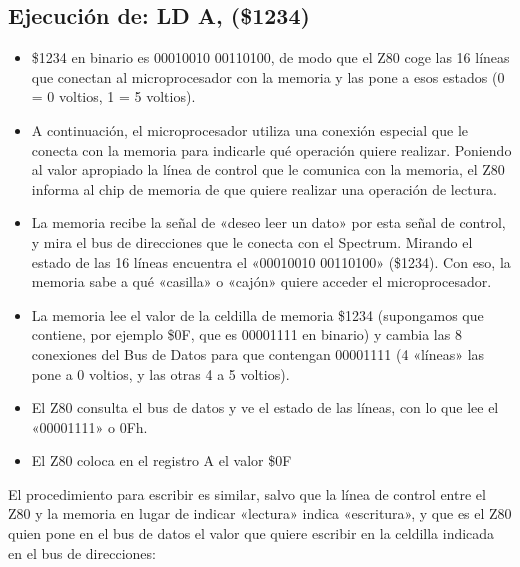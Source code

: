 \documentclass[letterpaper,10pt,spanish]{sphinxmanual}
\begin{document}
\subsection{Ejecución de: LD A, (\$1234)}
\label{\detokenize{03_arquitectura/arquitectura:ejecucion-de-ld-a-1234}}\begin{itemize}
\item {} 
\$1234 en binario es 00010010 00110100, de modo que el Z80 coge las 16 líneas que conectan al microprocesador con la memoria y las pone a esos estados (0 = 0 voltios, 1 = 5 voltios).

\item {} 
A continuación, el microprocesador utiliza una conexión especial que le conecta con la memoria para indicarle qué operación quiere realizar. Poniendo al valor apropiado la línea de control que le comunica con la memoria, el Z80 informa al chip de memoria de que quiere realizar una operación de lectura.

\item {} 
La memoria recibe la señal de «deseo leer un dato» por esta señal de control, y mira el bus de direcciones que le conecta con el Spectrum. Mirando el estado de las 16 líneas encuentra el «00010010 00110100» (\$1234). Con eso, la memoria sabe a qué «casilla» o «cajón» quiere acceder el microprocesador.

\item {} 
La memoria lee el valor de la celdilla de memoria \$1234 (supongamos que contiene, por ejemplo \$0F, que es 00001111 en binario) y cambia las 8 conexiones del Bus de Datos para que contengan 00001111 (4 «líneas» las pone a 0 voltios, y las otras 4 a 5 voltios).

\item {} 
El Z80 consulta el bus de datos y ve el estado de las líneas, con lo que lee el «00001111» o 0Fh.

\item {} 
El Z80 coloca en el registro A el valor \$0F

\end{itemize}

El procedimiento para escribir es similar, salvo que la línea de control entre el Z80 y la memoria en lugar de indicar «lectura» indica «escritura», y que es el Z80 quien pone en el bus de datos el valor que quiere escribir en la celdilla indicada en el bus de direcciones:
\end{document}
